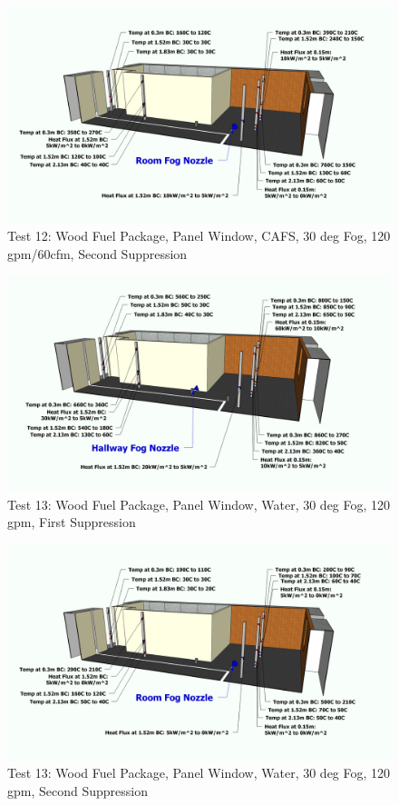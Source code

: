 \documentclass[12pt,oneside]{book}
\begin{document}
\begin{figure}[!ht]
	\includegraphics[width=6in]{../Figures/Pictures/Metric/DelCoFogTest12SecondSuppression}
	\caption{Test 12: Wood Fuel Package, Panel Window, CAFS, 30 deg Fog, 120 gpm/60cfm, Second Suppression}
	\label{fig:Test_12_Second_Suppression}
\end{figure}

\begin{figure}[!ht]
	\includegraphics[width=6in]{../Figures/Pictures/Metric/DelCoFogTest13FirstSuppression}
	\caption{Test 13: Wood Fuel Package, Panel Window, Water, 30 deg Fog, 120 gpm, First Suppression}
	\label{fig:Test_13_First_Suppression}
\end{figure}

\begin{figure}[!ht]
	\includegraphics[width=6in]{../Figures/Pictures/Metric/DelCoFogTest13SecondSuppression}
	\caption{Test 13: Wood Fuel Package, Panel Window, Water, 30 deg Fog, 120 gpm, Second Suppression}
	\label{fig:Test_13_Second_Suppression}
\end{figure}
\end{document}
